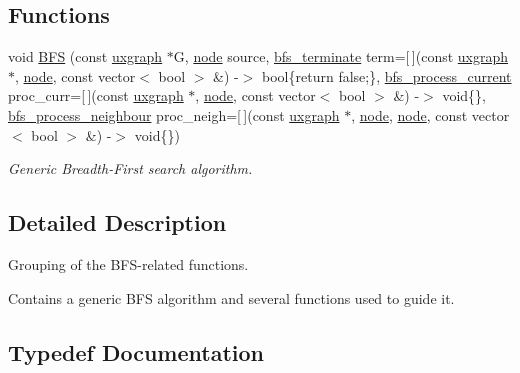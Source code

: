 \subsection*{Functions}
\begin{DoxyCompactItemize}
\item 
void \hyperlink{namespacelgraph_1_1traversal_1_1bfs_ab806c790c2fdfd03a0bc0bb9d4186043}{B\+FS} (const \hyperlink{classlgraph_1_1utils_1_1uxgraph}{uxgraph} $\ast$G, \hyperlink{namespacelgraph_1_1utils_a7bd66ede3805ef121bc2835bd48de0cf}{node} source, \hyperlink{namespacelgraph_1_1traversal_1_1bfs_a2622d8419e685b0a28b9ad70ca6c1565}{bfs\+\_\+terminate} term=\mbox{[}$\,$\mbox{]}(const \hyperlink{classlgraph_1_1utils_1_1uxgraph}{uxgraph} $\ast$, \hyperlink{namespacelgraph_1_1utils_a7bd66ede3805ef121bc2835bd48de0cf}{node}, const vector$<$ bool $>$ \&) -\/$>$ bool\{return false;\}, \hyperlink{namespacelgraph_1_1traversal_1_1bfs_a5a37d7fee20d8b473826d3599ada96b7}{bfs\+\_\+process\+\_\+current} proc\+\_\+curr=\mbox{[}$\,$\mbox{]}(const \hyperlink{classlgraph_1_1utils_1_1uxgraph}{uxgraph} $\ast$, \hyperlink{namespacelgraph_1_1utils_a7bd66ede3805ef121bc2835bd48de0cf}{node}, const vector$<$ bool $>$ \&) -\/$>$ void\{\}, \hyperlink{namespacelgraph_1_1traversal_1_1bfs_ab8c86ff87736f713c845b61ac6a0a956}{bfs\+\_\+process\+\_\+neighbour} proc\+\_\+neigh=\mbox{[}$\,$\mbox{]}(const \hyperlink{classlgraph_1_1utils_1_1uxgraph}{uxgraph} $\ast$, \hyperlink{namespacelgraph_1_1utils_a7bd66ede3805ef121bc2835bd48de0cf}{node}, \hyperlink{namespacelgraph_1_1utils_a7bd66ede3805ef121bc2835bd48de0cf}{node}, const vector$<$ bool $>$ \&) -\/$>$ void\{\})
\begin{DoxyCompactList}\small\item\em Generic Breadth-\/\+First search algorithm. \end{DoxyCompactList}\end{DoxyCompactItemize}


\subsection{Detailed Description}
Grouping of the B\+F\+S-\/related functions. 

Contains a generic B\+FS algorithm and several functions used to guide it. 

\subsection{Typedef Documentation}
